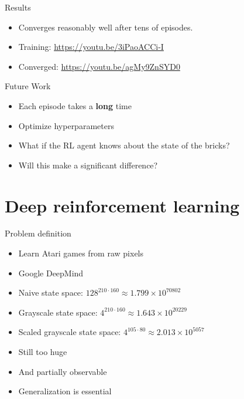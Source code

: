 \documentclass{beamer}
\begin{document}
\begin{frame}{Results}
  \begin{itemize}
    \item Converges reasonably well after tens of episodes.
  \end{itemize}
  \vspace{2em}
  \begin{itemize}
    \item Training: \url{https://youtu.be/3iPaoACCi-I}
    \item Converged: \url{https://youtu.be/agMy9ZnSYD0}
  \end{itemize}
\end{frame}

\begin{frame}{Future Work}
  \begin{itemize}
    \item Each episode takes a \textbf{long} time
    \item Optimize hyperparameters
  \end{itemize}
  \vspace{2em}
  \begin{itemize}
    \item What if the RL agent knows about the state of the bricks?
    \item Will this make a significant difference?
  \end{itemize}
\end{frame}

\section{Deep reinforcement learning}

\begin{frame}{Problem definition}
  \begin{itemize}
  \item {
    Learn Atari games from raw pixels
  }
  \item {
    Google DeepMind
  }
  \item {
      Naive state space: $128^{210 \cdot 160} \approx 1.799\times 10^{70802}$
  }
  \item {
      Grayscale state space: $4^{210 \cdot 160} \approx 1.643\times 10^{20229}$
  }
  \item {
      Scaled grayscale state space: $4^{105 \cdot 80} \approx 2.013\times 10^{5057}$
  }
  \item {
    Still too huge
  }
  \item {
    And partially observable
  }
  \item {
    Generalization is essential
  }
  \end{itemize}
\end{frame}
\end{document}
